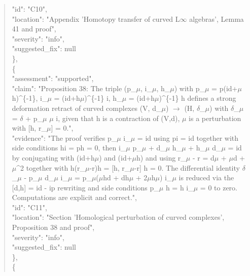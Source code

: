 \documentclass[11pt]{article}
\begin{document}
\begin{quote}
      "id": "C10",\\
      "location": "Appendix 'Homotopy transfer of curved L\ensuremath{\infty} algebras', Lemma 41 and proof",\\
      "severity": "info",\\
      "suggested\_fix": null\\
    \},\\
    \{\\
      "assessment": "supported",\\
      "claim": "Proposition 38: The triple (p\_\ensuremath{\mu}, i\_\ensuremath{\mu}, h\_\ensuremath{\mu}) with p\_\ensuremath{\mu} = p(id+\ensuremath{\mu}h)\^{}\{-1\}, i\_\ensuremath{\mu} = (id+h\ensuremath{\mu})\^{}\{-1\} i, h\_\ensuremath{\mu} = (id+h\ensuremath{\mu})\^{}\{-1\} h defines a strong deformation retract of curved complexes (V, d\_\ensuremath{\mu}) \ensuremath{\to} (H, \ensuremath{\delta}\_\ensuremath{\mu}) with \ensuremath{\delta}\_\ensuremath{\mu} = \ensuremath{\delta} + p\_\ensuremath{\mu} \ensuremath{\mu} i, given that h is a contraction of (V,d), \ensuremath{\mu} is a perturbation with [h, r\_\ensuremath{\mu}] = 0.",\\
      "evidence": "The proof verifies p\_\ensuremath{\mu} i\_\ensuremath{\mu} = id using pi = id together with side conditions hi = ph = 0, then i\_\ensuremath{\mu} p\_\ensuremath{\mu} + d\_\ensuremath{\mu} h\_\ensuremath{\mu} + h\_\ensuremath{\mu} d\_\ensuremath{\mu} = id by conjugating with (id+h\ensuremath{\mu}) and (id+\ensuremath{\mu}h) and using r\_\ensuremath{\mu} - r = d\ensuremath{\mu} + \ensuremath{\mu}d + \ensuremath{\mu}\^{}2 together with h(r\_\ensuremath{\mu}-r)h = [h, r\_\ensuremath{\mu}-r] h = 0. The differential identity \ensuremath{\delta}\_\ensuremath{\mu} - p\_\ensuremath{\mu} d\_\ensuremath{\mu} i\_\ensuremath{\mu} = p\_\ensuremath{\mu}(\ensuremath{\mu}hd + dh\ensuremath{\mu} + 2\ensuremath{\mu}h\ensuremath{\mu}) i\_\ensuremath{\mu} is reduced via the [d,h] = id - ip rewriting and side conditions p\_\ensuremath{\mu} h = h i\_\ensuremath{\mu} = 0 to zero. Computations are explicit and correct.",\\
      "id": "C11",\\
      "location": "Section 'Homological perturbation of curved complexes', Proposition 38 and proof",\\
      "severity": "info",\\
      "suggested\_fix": null\\
    \},\\
    \{\\

\end{quote}
\end{document}
